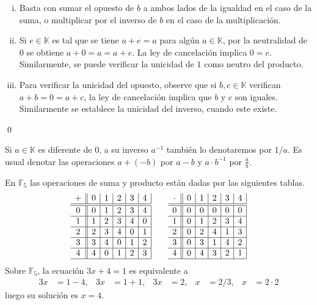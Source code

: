 \dem
\begin{enumerate}[(i)]
  \item Basta con sumar el opuesto de $b$ a ambos lados de la igualdad en el caso de la suma, o multiplicar por el inverso de $b$ en el caso de la multiplicación.
  \item Si $e\in \mathbb{K}$ es tal que se tiene $a+e=a$ para algún $a\in \mathbb{K}$, por la neutralidad de $0$ se obtiene $a+0=a=a+e$. La ley de cancelación implica $0=e$. Similarmente, se puede verificar la unicidad de $1$ como neutro del producto.
  \item Para verificar la unicidad del opuesto, observe que si $b,c\in \mathbb{K}$ verifican $a+b=0=a+c$, la ley de cancelación implica que $b$ y $c$ son iguales. Similarmente se establece la unicidad del inverso, cuando este existe.
\end{enumerate}
\qed

\begin{nota}
Si $a\in \mathbb{K}$ es diferente de $0$, a su inverso $a^{-1}$ también lo denotaremos por $1/a$. Es usual denotar las operaciones $a+(-b)$ por $a-b$ y $a\cdot b^{-1}$ por $\frac{a}{b}$.
\end{nota}

\begin{ejem}
  En $\mathbb{F}_5$ las operaciones de suma y producto están dadas por las siguientes tablas.
  {\small
    $$\begin{array}{c||c|c|c|c|c|}
    + & 0 & 1 & 2 & 3 & 4\\
    \hline
    \hline
    0 & 0 & 1 & 2 & 3 & 4\\
    \hline
    1 & 1 & 2 & 3 & 4 & 0\\
    \hline 
    2 & 2 & 3 & 4 & 0 & 1\\
    \hline 
    3 & 3 & 4 & 0 & 1 & 2\\
    \hline 
    4 & 4 & 0 & 1 & 2 & 3\\
    \hline 
    \end{array} \qquad
    \begin{array}{c||c|c|c|c|c|}
    \cdot & 0 & 1 & 2 & 3 & 4\\
    \hline
    \hline
    0 & 0 & 0 & 0 & 0 & 0\\
    \hline
    1 & 0 & 1 & 2 & 3 & 4\\
    \hline 
    2 & 0 & 2 & 4 & 1 & 3\\
    \hline 
    3 & 0 & 3 & 1 & 4 & 2\\
    \hline 
    4 & 0 & 4 & 3 & 2 & 1\\
    \hline 
    \end{array}
  $$
  }
  Sobre $\mathbb{F}_5$, la ecuación $3x+4=1$ es equivalente a
    \begin{align*}
    3x & = 1-4, & 3x & = 1+1, & 3x & = 2, & x & = 2/3, & x & = 2\cdot 2
    \end{align*}
  luego su solución es $x=4$.
  \end{ejem}

